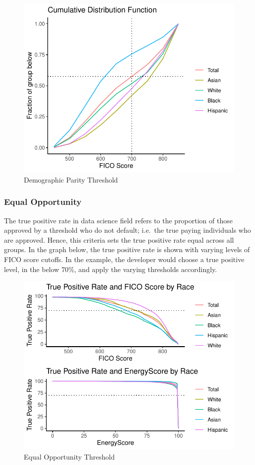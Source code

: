 \documentclass[11pt,]{article}
\begin{document}
\begin{figure}
\centering
\includegraphics{figs/demparity.pdf}
\caption{\label{fig:demparity}Demographic Parity Threshold}
\end{figure}

\hypertarget{equal-opportunity}{%
\subsubsection{Equal Opportunity}\label{equal-opportunity}}

The true positive rate in data science field refers to the proportion of
those approved by a threshold who do not default; i.e.~the true paying
individuals who are approved. Hence, this criteria sets the true
positive rate equal across all groups. In the graph below, the true
positive rate is shown with varying levels of FICO score cutoffs. In the
example, the developer would choose a true positive level, in the below
70\%, and apply the varying thresholds accordingly.

\begin{figure}
\centering
\includegraphics{figs/equalop.pdf}
\caption{\label{fig:equalop}Equal Opportunity Threshold}
\end{figure}
\end{document}
